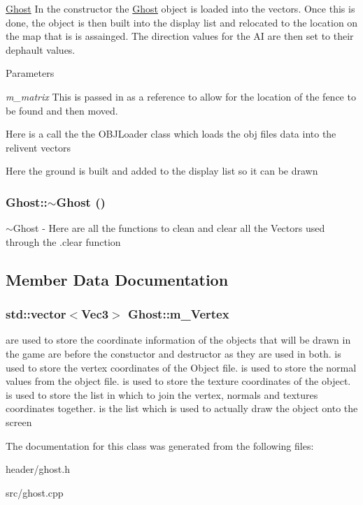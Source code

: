 \hyperlink{classGhost}{Ghost} In the constructor the \hyperlink{classGhost}{Ghost} object is loaded into the vectors. Once this is done, the object is then built into the display list and relocated to the location on the map that is is assainged. The direction values for the AI are then set to their dephault values. 
\begin{DoxyParams}{Parameters}
\item[{\em m\_\-matrix}]This is passed in as a reference to allow for the location of the fence to be found and then moved. \end{DoxyParams}


Here is a call the the OBJLoader class which loads the obj files data into the relivent vectors

Here the ground is built and added to the display list so it can be drawn \hypertarget{classGhost_a063ed19c1b6f5c07b9109020c6198319}{
\subsubsection[{$\sim$Ghost}]{\setlength{\rightskip}{0pt plus 5cm}Ghost::$\sim$Ghost ()}}
\label{classGhost_a063ed19c1b6f5c07b9109020c6198319}


$\sim$Ghost -\/ Here are all the functions to clean and clear all the Vectors used through the .clear function 

\subsection{Member Data Documentation}
\hypertarget{classGhost_ac4f35ef7a70aba7d457c615a860c6d64}{
\subsubsection[{m\_\-Vertex}]{\setlength{\rightskip}{0pt plus 5cm}std::vector$<${\bf Vec3}$>$ {\bf Ghost::m\_\-Vertex}}}
\label{classGhost_ac4f35ef7a70aba7d457c615a860c6d64}
are used to store the coordinate information of the objects that will be drawn in the game  are before the constuctor and destructor as they are used in both.  is used to store the vertex coordinates of the Object file.  is used to store the normal values from the object file.  is used to store the texture coordinates of the object.  is used to store the list in which to join the vertex, normals and textures coordinates together.  is the list which is used to actually draw the object onto the screen 

The documentation for this class was generated from the following files:\begin{DoxyCompactItemize}
\item 
header/ghost.h\item 
src/ghost.cpp\end{DoxyCompactItemize}
